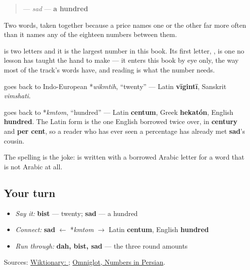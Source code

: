 \begin{quote}
\textbf{} — \emph{sad} — \textbf{a hundred}
\end{quote}

Two words, taken together because a price names one or the other far more often than it names any of the eighteen numbers between them.

\textbf{} is two letters and it is the largest number in this book. Its first letter, \textbf{}, is one no lesson has taught the hand to make — it enters this book by eye only, the way most of the track's words have, and reading is what the number needs.

\begin{cousinweb}
\textbf{} goes back to Indo-European *\emph{wikmtih}, \textquotedblleft{}twenty\textquotedblright{} — Latin \textbf{vīgintī}, Sanskrit \emph{vimshati}.

\textbf{} goes back to *\emph{kmtom}, \textquotedblleft{}hundred\textquotedblright{} — Latin \textbf{centum}, Greek \textbf{hekatón}, English \textbf{hundred}. The Latin form is the one English borrowed twice over, in \textbf{century} and \textbf{per cent}, so a reader who has ever seen a percentage has already met \textbf{sad}'s cousin.

The spelling is the joke: \textbf{} is written with a borrowed Arabic letter for a word that is not Arabic at all.
\end{cousinweb}

\subsection*{Your turn}
\begin{itemize}
\raggedright
  \item \emph{Say it:} \textbf{bist} — twenty; \textbf{sad} — a hundred
  \item \emph{Connect:} \textbf{sad} $\leftarrow$ *\emph{kmtom} $\to$ Latin \textbf{centum}, English \textbf{hundred}
  \item \emph{Run through:} \textbf{dah, bist, sad} — the three round amounts
\end{itemize}

\begin{tcolorbox}[breakable,colback=teal!4,colframe=teal!35!black,title={Before you move on}]
Sources: \href{https://en.wiktionary.org/wiki/\%D8\%B5\%D8\%AF}{Wiktionary: }; \href{https://www.omniglot.com/language/numbers/persian.htm}{Omniglot, Numbers in Persian}.
\end{tcolorbox}
